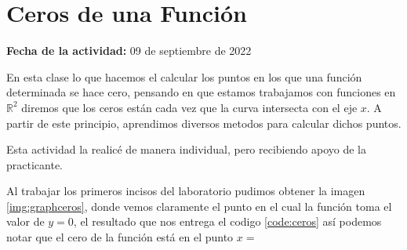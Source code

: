 \documentclass[../portafolio.tex]{subfiles}
\begin{document}


\section{Ceros de una Funci\'on}   %

\hfill \textbf{Fecha de la actividad:} 09 de septiembre de 2022

\medskip

En esta clase lo que hacemos el calcular los puntos en los que una funci\'on determinada se hace cero, pensando en que estamos trabajamos con funciones en $\mathbb{R}^2$ diremos que los ceros est\'an cada vez que la curva intersecta con el eje $x$. A partir de este principio, aprendimos diversos metodos para calcular dichos puntos.


Esta actividad la realic\'e de manera individual, pero recibiendo apoyo de la practicante.

Al trabajar los primeros incisos del laboratorio pudimos obtener la imagen \ref{img:graphceros}, donde vemos claramente el punto en el cual la funci\'on toma el valor de $y=0$, el resultado que nos entrega el codigo \ref{code:ceros} as\'i podemos notar que el cero de la funci\'on est\'a en el punto $x=$
\end{document}
